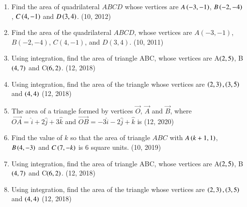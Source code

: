 \begin{enumerate}[label=\thesubsection.\arabic*,ref=\thesubsection.\theenumi]
\item Find the area of quadrilateral $ABCD$ whose vertices are $A\left(-3,-1\right)$, $B\left(-2,-4\right)$, $C\left(4,-1\right)$ and $D\left(3,4\right)$.
\hfill (10, 2012)
\item Find the area of the quadrilateral $ABCD$, whose vertices are $A(-3, -1)$, $B(-2, -4)$, $C(4, -1)$, and $D(3, 4)$.
\hfill (10, 2011)
\item Using integration, find the area of triangle ABC, whose vertices are A$\left(2, 5\right)$, B$\left(4, 7\right)$ and C$\left(6, 2\right)$.
\hfill (12, 2018)
\item Using integration, find the area of the triangle whose vertices are $\left(2,3\right),\left(3,5\right)$ and $\left(4,4\right)$
\hfill (12, 2018)
\item The area of a triangle formed by vertices $\vec{O}$, $\vec{A}$ and $\vec{B}$, where $\overrightarrow{OA}= \hat{i}+2 \hat{j}+3\hat{k}$ and $\overrightarrow{OB}= -3\hat{i} - 2\hat{j} + \hat{k}$ is
\hfill (12, 2020)
\item Find the value of $k$ so that the area of triangle $ABC$ with $A\left(k + 1, 1\right)$, $B\left(4, -3\right)$ and $C\left(7, -k\right)$ is $6$ square units.
\hfill (10, 2019)
\item Using integration, find the area of triangle ABC, whose vertices are A$\left(2, 5\right)$, B$\left(4, 7\right)$ and C$\left(6, 2\right)$.
\hfill (12, 2018)
\item Using integration, find the area of the triangle whose vertices are $\left(2,3\right),\left(3,5\right)$ and $\left(4,4\right)$
\hfill (12, 2018)

\end{enumerate}
